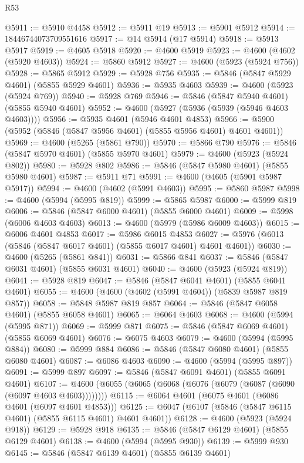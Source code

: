 \begin{lexlean}{R53}
\begin{coremodule}
@5911 := @5910 @4458
@5912 := @5911 @19
@5913 := @5901 @5912
@5914 := 18446744073709551616
@5917 := @14 @5914 (@17 @5914)
@5918 := @5913 @5917
@5919 := @4605 @5918
@5920 := @4600 @5919
@5923 := @4600 (@4602 (@5920 @4603))
@5924 := @5860 @5912
@5927 := @4600 (@5923 (@5924 @756))
@5928 := @5865 @5912
@5929 := @5928 @756
@5935 := @5846 (@5847 @5929 @4601) (@5855 @5929 @4601)
@5936 := @5935 @4603
@5939 := @4600 (@5923 (@5924 @769))
@5940 := @5928 @769
@5946 := @5846 (@5847 @5940 @4601) (@5855 @5940 @4601)
@5952 := @4600 (@5927 (@5936 (@5939 (@5946 @4603 @4603))))
@5956 := @5935 @4601 (@5946 @4601 @4853)
@5966 := @5900 (@5952 (@5846 (@5847 @5956 @4601) (@5855 @5956 @4601) @4601 @4601))
@5969 := @4600 (@5265 (@5861 @790))
@5970 := @5866 @790
@5976 := @5846 (@5847 @5970 @4601) (@5855 @5970 @4601)
@5979 := @4600 (@5923 (@5924 @802))
@5980 := @5928 @802
@5986 := @5846 (@5847 @5980 @4601) (@5855 @5980 @4601)
@5987 := @5911 @71
@5991 := @4600 (@4605 (@5901 @5987 @5917))
@5994 := @4600 (@4602 (@5991 @4603))
@5995 := @5860 @5987
@5998 := @4600 (@5994 (@5995 @819))
@5999 := @5865 @5987
@6000 := @5999 @819
@6006 := @5846 (@5847 @6000 @4601) (@5855 @6000 @4601)
@6009 := @5998 (@6006 @4603 @4603)
@6013 := @4600 (@5979 (@5986 @6009 @4603))
@6015 := @6006 @4601 @4853
@6017 := @5986 @6015 @4853
@6027 := @5976 (@6013 (@5846 (@5847 @6017 @4601) (@5855 @6017 @4601) @4601 @4601))
@6030 := @4600 (@5265 (@5861 @841))
@6031 := @5866 @841
@6037 := @5846 (@5847 @6031 @4601) (@5855 @6031 @4601)
@6040 := @4600 (@5923 (@5924 @819))
@6041 := @5928 @819
@6047 := @5846 (@5847 @6041 @4601) (@5855 @6041 @4601)
@6055 := @4600 (@4600 (@4602 (@5991 @4604)) (@5839 @5987 @819 @857))
@6058 := @5848 @5987 @819 @857
@6064 := @5846 (@5847 @6058 @4601) (@5855 @6058 @4601)
@6065 := @6064 @4603
@6068 := @4600 (@5994 (@5995 @871))
@6069 := @5999 @871
@6075 := @5846 (@5847 @6069 @4601) (@5855 @6069 @4601)
@6076 := @6075 @4603
@6079 := @4600 (@5994 (@5995 @884))
@6080 := @5999 @884
@6086 := @5846 (@5847 @6080 @4601) (@5855 @6080 @4601)
@6087 := @6086 @4603
@6090 := @4600 (@5994 (@5995 @897))
@6091 := @5999 @897
@6097 := @5846 (@5847 @6091 @4601) (@5855 @6091 @4601)
@6107 := @4600 (@6055 (@6065 (@6068 (@6076 (@6079 (@6087 (@6090 (@6097 @4603 @4603))))))))
@6115 := @6064 @4601 (@6075 @4601 (@6086 @4601 (@6097 @4601 @4853)))
@6125 := @6047 (@6107 (@5846 (@5847 @6115 @4601) (@5855 @6115 @4601) @4601 @4601))
@6128 := @4600 (@5923 (@5924 @918))
@6129 := @5928 @918
@6135 := @5846 (@5847 @6129 @4601) (@5855 @6129 @4601)
@6138 := @4600 (@5994 (@5995 @930))
@6139 := @5999 @930
@6145 := @5846 (@5847 @6139 @4601) (@5855 @6139 @4601)

\end{coremodule}
\end{lexlean}
